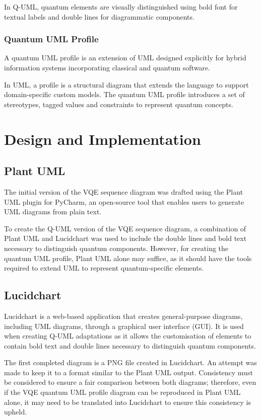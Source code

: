 \documentclass{article}
\begin{document}
In Q-UML, quantum elements are visually distinguished using bold font for textual labels and double lines for diagrammatic components. 

\subsubsection{Quantum UML Profile}

A quantum UML profile is an extension of UML designed explicitly for hybrid information systems incorporating classical and quantum software.

In UML, a profile is a structural diagram that extends the language to support domain-specific custom models. The quantum UML profile introduces a set of stereotypes, tagged values and constraints to represent quantum concepts. 

\section{Design and Implementation}
\subsection{Plant UML}

The initial version of the VQE sequence diagram was drafted using the Plant UML plugin for PyCharm, an open-source tool that enables users to generate UML diagrams from plain text.

To create the Q-UML version of the VQE sequence diagram, a combination of Plant UML and Lucidchart was used to include the double lines and bold text necessary to distinguish quantum components. However, for creating the quantum UML profile, Plant UML alone may suffice, as it should have the tools required to extend UML to represent quantum-specific elements. 

\subsection{Lucidchart}

Lucidchart is a web-based application that creates general-purpose diagrams, including UML diagrams, through a graphical user interface (GUI). It is used when creating Q-UML adaptations as it allows the customisation of elements to contain bold text and double lines necessary to distinguish quantum components. 

The first completed diagram is a PNG file created in Lucidchart. An attempt was made to keep it to a format similar to the Plant UML output. Consistency must be considered to ensure a fair comparison between both diagrams; therefore, even if the VQE quantum UML profile diagram can be reproduced in Plant UML alone, it may need to be translated into Lucidchart to ensure this consistency is upheld.
\end{document}
